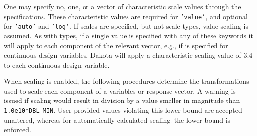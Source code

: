 One may specify no, one, or a vector of characteristic scale values
through the  specifications.  These characteristic
values are required for {\tt 'value'}, and optional for {\tt 'auto'}
and {\tt 'log'}. If scales are specified, but not scale types, value
scaling is assumed. As with types, if a single value is specified with
any of these keywords it will apply to each component of the relevant
vector, e.g., if  is specified for continuous
design variables, Dakota will apply a characteristic scaling value of
3.4 to each continuous design variable.

When scaling is enabled, the following procedures determine the
transformations used to scale each component of a variables or
response vector. A warning is issued if scaling would result in
division by a value smaller in magnitude than {\tt 1.0e10*DBL\_MIN}.
User-provided values violating this lower bound are accepted
unaltered, whereas for automatically calculated scaling, the lower
bound is enforced.

